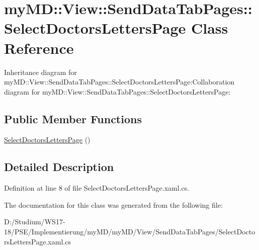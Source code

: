 \hypertarget{classmy_m_d_1_1_view_1_1_send_data_tab_pages_1_1_select_doctors_letters_page}{
\section{my\-MD::View::Send\-Data\-Tab\-Pages::Select\-Doctors\-Letters\-Page Class Reference}
\label{d7/d7e/classmy_m_d_1_1_view_1_1_send_data_tab_pages_1_1_select_doctors_letters_page}
}
Inheritance diagram for my\-MD::View::Send\-Data\-Tab\-Pages::Select\-Doctors\-Letters\-Page:Collaboration diagram for my\-MD::View::Send\-Data\-Tab\-Pages::Select\-Doctors\-Letters\-Page:\subsection*{Public Member Functions}
\begin{CompactItemize}
\item 
\hypertarget{classmy_m_d_1_1_view_1_1_send_data_tab_pages_1_1_select_doctors_letters_page_6ab40ce41ec5ce2f4bf387a39790e448}{
\hyperlink{classmy_m_d_1_1_view_1_1_send_data_tab_pages_1_1_select_doctors_letters_page_6ab40ce41ec5ce2f4bf387a39790e448}{Select\-Doctors\-Letters\-Page} ()}
\label{d7/d7e/classmy_m_d_1_1_view_1_1_send_data_tab_pages_1_1_select_doctors_letters_page_6ab40ce41ec5ce2f4bf387a39790e448}

\end{CompactItemize}


\subsection{Detailed Description}




Definition at line 8 of file Select\-Doctors\-Letters\-Page.xaml.cs.

The documentation for this class was generated from the following file:\begin{CompactItemize}
\item 
D:/Studium/WS17-18/PSE/Implementierung/my\-MD/my\-MD/View/Send\-Data\-Tab\-Pages/Select\-Doctors\-Letters\-Page.xaml.cs\end{CompactItemize}

